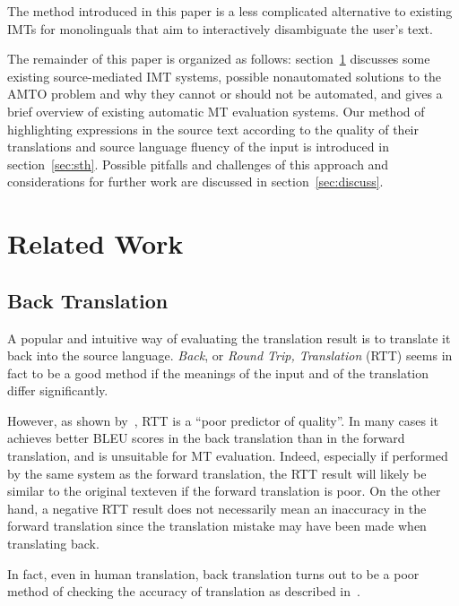 \documentclass[hidelinks,10pt,letter]{article} %
\begin{document}
    The method introduced in this paper is a less complicated alternative to existing
    IMTs for monolinguals that aim to interactively disambiguate the user's text.
    
    The remainder of this paper is organized as follows:
    section~\ref{sec:related} discusses some existing source-mediated IMT systems, 
    possible nonautomated solutions to the AMTO problem and
    why they cannot or should not be automated, and gives a brief overview of existing automatic
    MT evaluation systems.
    Our method of highlighting expressions in the source text according to the quality of their translations
    and source language fluency of the input
    is introduced in section~\ref{sec:sth}. Possible pitfalls and challenges of this approach and considerations for further work
    are discussed 
    in section~\ref{sec:discuss}.
    
   
    \section{Related Work}\label{sec:related}
    
      \subsection{Back Translation}
      A popular and intuitive way of evaluating the translation result is to
      translate it back into the source language. 
      \textit{Back}, or \textit{Round Trip, Translation} (RTT) seems in fact to be a good method if the 
      meanings of the input and of the translation differ significantly.
      
      However, as shown by~\cite{somers2005round},
      RTT is a ``poor predictor of quality''. In many cases it achieves better BLEU
      scores in the back translation than in the forward translation, 
      and is unsuitable for MT evaluation.
      Indeed, especially if performed by the same system as the forward translation,
      the RTT result will likely be similar to the original text\dash even if the forward translation
      is poor. On the other hand, a negative RTT result does not necessarily mean
      an inaccuracy in the forward translation since the translation mistake may have been
      made when translating back.
      
      In fact, even in human translation, back translation
      turns out to be a poor method of
      checking the accuracy of translation as described in~\cite{douglas2007collaborative}.
      
\end{document}
